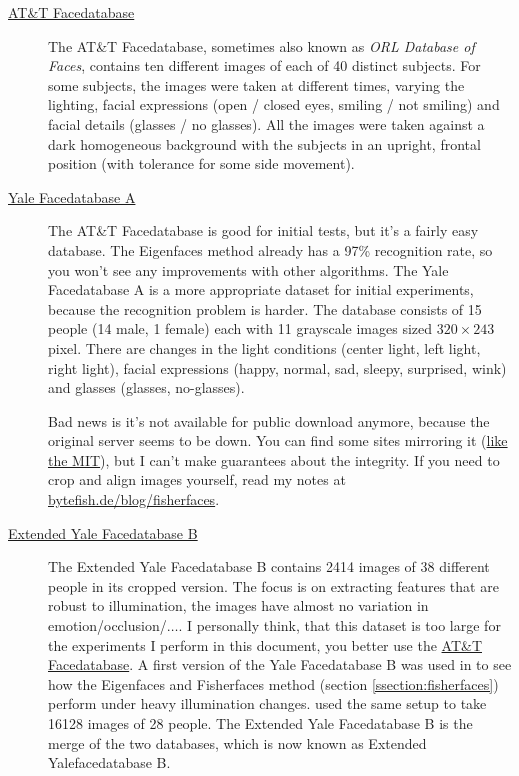 \begin{description}

	\item[\href{http://www.cl.cam.ac.uk/research/dtg/attarchive/facedatabase.html}{AT\&T Facedatabase}] The AT\&T Facedatabase, sometimes also known as \textit{ORL Database of Faces}, contains ten different images of each of 40 distinct subjects. For some subjects, the images were taken at different times, varying the lighting, facial expressions (open / closed eyes, smiling / not smiling) and facial details (glasses / no glasses). All the images were taken against a dark homogeneous background with the subjects in an upright, frontal position (with tolerance for some side movement).
	
	\item[\href{http://cvc.yale.edu/projects/yalefaces/yalefaces.html}{Yale Facedatabase A}] The AT\&T Facedatabase is good for initial tests, but it's a fairly easy database. The Eigenfaces method already has a 97\% recognition rate, so you won't see any improvements with other algorithms. The Yale Facedatabase A is a more appropriate dataset for initial experiments, because the recognition problem is harder. The database consists of 15 people (14 male, 1 female) each with 11 grayscale images sized $320 \times 243$ pixel. There are changes in the light conditions (center light, left light, right light), facial expressions (happy, normal, sad, sleepy, surprised, wink) and glasses (glasses, no-glasses). 
	
	Bad news is it's not available for public download anymore, because the original server seems to be down. You can find some sites mirroring it (\href{http://vismod.media.mit.edu/vismod/classes/mas622-00/datasets/}{like the MIT}), but I can't make guarantees about the integrity. If you need to crop and align images yourself, read my notes at \href{http://bytefish.de/blog/fisherfaces}{bytefish.de/blog/fisherfaces}.
	
	\item[\href{http://vision.ucsd.edu/~leekc/ExtYaleDatabase/ExtYaleB.html}{Extended Yale Facedatabase B}] The Extended Yale Facedatabase B contains 2414 images of 38 different people in its cropped version. The focus is on extracting features that are robust to illumination, the images have almost no variation in emotion/occlusion/$\ldots$. I personally think, that this dataset is too large for the experiments I perform in this document, you better use the \href{http://www.cl.cam.ac.uk/research/dtg/attarchive/facedatabase.html}{AT\&T Facedatabase}. A first version of the Yale Facedatabase B was used in \cite{belhumeru97} to see how the Eigenfaces and Fisherfaces method (section \ref{ssection:fisherfaces}) perform under heavy illumination changes. \cite{Lee2005} used the same setup to take 16128 images of 28 people. The Extended Yale Facedatabase B is the merge of the two databases, which is now known as Extended Yalefacedatabase B.

\end{description}

